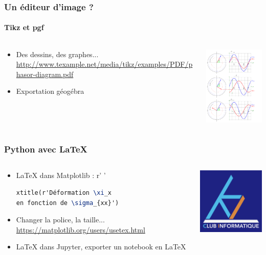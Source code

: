\documentclass{beamer}
\begin{document}
\begin{frame}
    \frametitle{Un éditeur d'image ?}
    \framesubtitle{Tikz et pgf}
 \begin{columns}
    \begin{column}[c]{6cm}
    \begin{itemize}
        \item<1-> Des dessins, des graphes...
        \url{http://www.texample.net/media/tikz/examples/PDF/phasor-diagram.pdf}
        \item<2-> Exportation géogébra
    \end{itemize}

    \end{column}
    \begin{column}[c]{5cm}
	\includegraphics[width=5cm]{phasor-diagram.pdf}
    \end{column}
  \end{columns}
\end{frame}

\begin{frame}[fragile]
    \frametitle{Python avec LaTeX}
\begin{columns}
    \begin{column}[c]{7cm}
    \begin{itemize}
        \item<1-> LaTeX dans Matplotlib : r' '
        \begin{lstlisting}[language=TeX]
xtitle(r'Déformation \xi_x 
en fonction de \sigma_{xx}')
        \end{lstlisting}
        \item<2-> Changer la police, la taille...
        \url{https://matplotlib.org/users/usetex.html}
        \item<3-> LaTeX dans Jupyter, exporter un notebook en LaTeX
    \end{itemize}

    \end{column}
    \begin{column}[c]{4cm}
	\includegraphics[width=4cm]{logo-ki.pdf}
    \end{column}
  \end{columns}
\end{frame}
\end{document}
